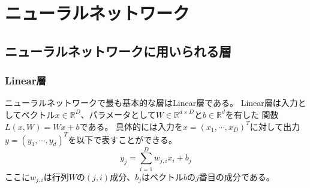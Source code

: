 \section{\mc ニューラルネットワーク}
\subsection{\mc ニューラルネットワークに用いられる層}
\subsubsection{\rm Linear\mc 層}
ニューラルネットワークで最も基本的な層はLinear層である。
Linear層は入力としてベクトル\(x \in \mathbb R^D\)、パラメータとして\(W \in \mathbb R^{d\times D}\)と\(b \in \mathbb R^d\)を有した
関数\(L(x,W) = Wx + b\)である。
具体的には入力を\(x=(x_1,\cdots,x_D)^T\)に対して出力\(y=(y_1,\cdots,y_d)^T\)を以下で表すことができる。
\begin{equation}
    y_j = \sum_{i=1}^D  w_{j,i}x_i + b_j 
\end{equation}
ここに\(w_{j,i}\)は行列\(W\)の\((j,i)\)成分、\(b_j\)はベクトル\(b\)の\(j\)番目の成分である。


